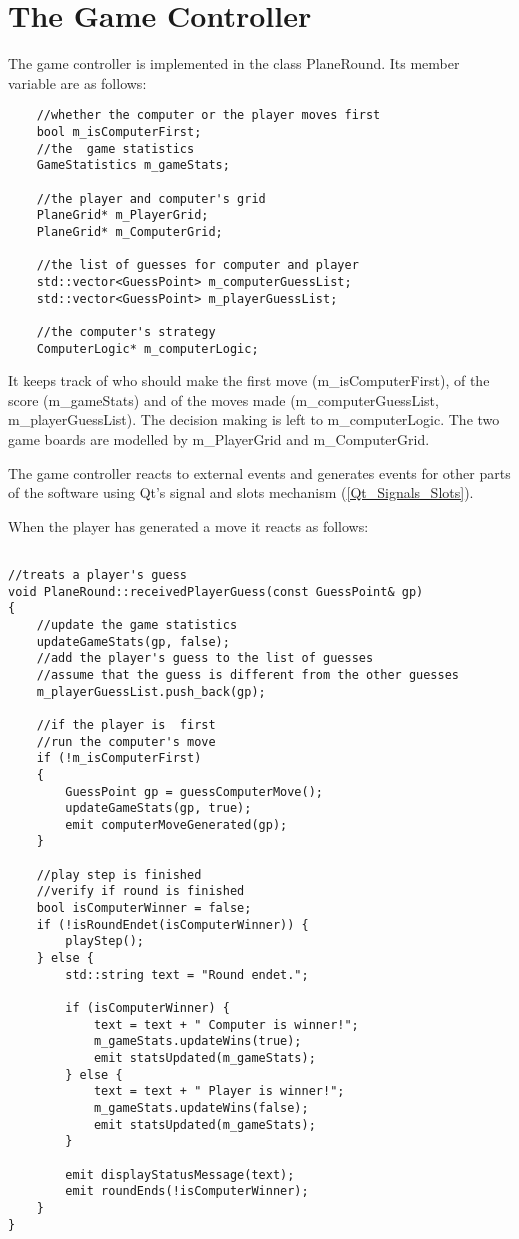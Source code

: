 \section{The Game Controller}

The game controller is implemented in the class PlaneRound. Its member variable are as follows:

\begin{lstlisting}
	//whether the computer or the player moves first
	bool m_isComputerFirst;
	//the  game statistics
	GameStatistics m_gameStats;
	
	//the player and computer's grid
	PlaneGrid* m_PlayerGrid;
	PlaneGrid* m_ComputerGrid;
	
	//the list of guesses for computer and player
	std::vector<GuessPoint> m_computerGuessList;
	std::vector<GuessPoint> m_playerGuessList;
	
	//the computer's strategy
	ComputerLogic* m_computerLogic;
\end{lstlisting}

It keeps track of who should make the first move (m\_isComputerFirst), of the score (m\_gameStats) and of the moves made (m\_computerGuessList, m\_playerGuessList). The decision making is left to m\_computerLogic. The two game boards are modelled by m\_PlayerGrid and m\_ComputerGrid.

The game controller reacts to external events and generates events for other parts of the software using Qt's signal and slots mechanism (\ref{Qt_Signals_Slots}). 

When the player has generated a move it reacts as follows:

\begin{lstlisting}

//treats a player's guess
void PlaneRound::receivedPlayerGuess(const GuessPoint& gp)
{
	//update the game statistics
	updateGameStats(gp, false);
	//add the player's guess to the list of guesses
	//assume that the guess is different from the other guesses
	m_playerGuessList.push_back(gp);
	
	//if the player is  first
	//run the computer's move
	if (!m_isComputerFirst)
	{
		GuessPoint gp = guessComputerMove();
		updateGameStats(gp, true);
		emit computerMoveGenerated(gp);
	}
	
	//play step is finished
	//verify if round is finished
	bool isComputerWinner = false;
	if (!isRoundEndet(isComputerWinner)) {
		playStep();
	} else {
		std::string text = "Round endet.";
		
		if (isComputerWinner) {
			text = text + " Computer is winner!";
			m_gameStats.updateWins(true);
			emit statsUpdated(m_gameStats);
		} else {
			text = text + " Player is winner!";
			m_gameStats.updateWins(false);
			emit statsUpdated(m_gameStats);
		}
		
		emit displayStatusMessage(text);
		emit roundEnds(!isComputerWinner);
	}
}

\end{lstlisting}

